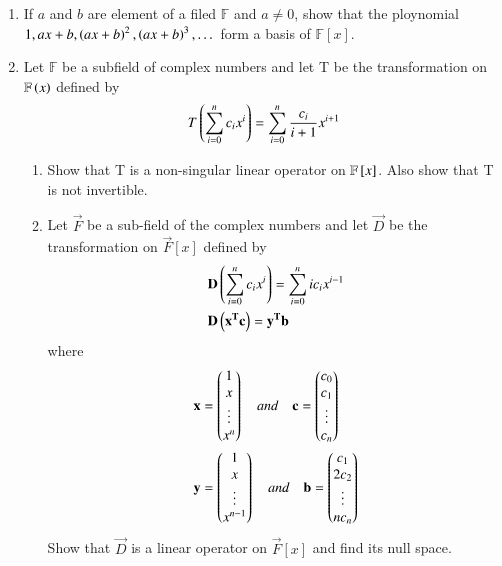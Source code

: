 \begin{enumerate}[label=\thesubsection.\arabic*.,ref=\thesubsection.\theenumi]
%
\\
\solution

\item If $a$ and $b$ are element of a filed $\mathbb{F}$ and $ a \neq 0$, show that the ploynomial $ 1, ax+b, \left(ax+b\right)^2, \left(ax+b\right)^3,  \dots $ form a basis of $\mathbb{F}[x].$
%
\\
\solution

\twocolumn
\item Let $\mathbb{F}$ be a subfield of complex numbers and let T be the transformation on $\mathbb{F}\left(x\right)$ defined by
\begin{align}
T\left(\sum \limits_{i=0}^n c_i x^i\right)=\sum \limits_{i=0}^n \frac{c_i}{i+1} x^{i+1}\label{q}
\end{align}
\begin{enumerate}
\item  Show that T is a non-singular linear operator on $\mathbb{F}{}\left[x\right]$. Also show that T is not invertible.
\\
\solution

\item Let $\vec{F}$ be a sub-field of the complex numbers and let $\vec{D}$ be the transformation on $\vec{F}[x]$ defined by
\begin{align}
& \mathbf{D}\left(\sum_{i=0}^{n}c_ix^{i}\right) = \sum_{i=0}^{n}ic_ix^{i-1} \label{eq:solutions/4/1/9/b/1} \\
& \mathbf{D}\left(\mathbf{x^Tc}\right) = \mathbf{y^{T}b}
\end{align}
where
\begin{align}
& \mathbf{x} = \begin{pmatrix}1 \\ x \\ \vdots \\ x^n\end{pmatrix} \quad and \quad \mathbf{c} =\begin{pmatrix}c_0 \\ c_1 \\ \vdots \\ c_n\end{pmatrix} \\
& \mathbf{y} = \begin{pmatrix}1 \\ x \\ \vdots \\ x^{n-1}\end{pmatrix} \quad and \quad  \mathbf{b} = \begin{pmatrix}c_1 \\ 2c_2 \\ \vdots \\ nc_n\end{pmatrix}
\end{align}
Show that $\vec{D}$ is a linear operator on $\vec{F}[x]$ and find its null space.
%
\\
\solution

\end{enumerate}
\end{enumerate}
